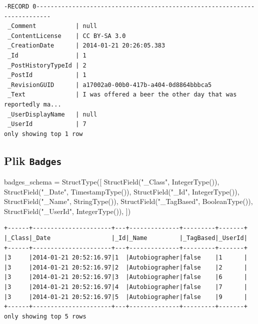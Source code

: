 \documentclass[
  letterpaper,
  DIV=11,
  numbers=noendperiod]{scrreprt}
\newenvironment{Shaded}{\begin{snugshade}}{\end{snugshade}}
\newcommand{\NormalTok}[1]{\textcolor[rgb]{0.00,0.23,0.31}{#1}}
\newcommand{\OperatorTok}[1]{\textcolor[rgb]{0.37,0.37,0.37}{#1}}
\newcommand{\StringTok}[1]{\textcolor[rgb]{0.13,0.47,0.30}{#1}}
\begin{document}
\begin{verbatim}
-RECORD 0--------------------------------------------------------------------------
 _Comment           | null                                                         
 _ContentLicense    | CC BY-SA 3.0                                                 
 _CreationDate      | 2014-01-21 20:26:05.383                                      
 _Id                | 1                                                            
 _PostHistoryTypeId | 2                                                            
 _PostId            | 1                                                            
 _RevisionGUID      | a17002a0-00b0-417b-a404-0d8864bbbca5                         
 _Text              | I was offered a beer the other day that was reportedly ma... 
 _UserDisplayName   | null                                                         
 _UserId            | 7                                                            
only showing top 1 row
\end{verbatim}

\normalsize

\hypertarget{plik-badges}{%
\subsection{\texorpdfstring{Plik
\texttt{Badges}}{Plik Badges}}\label{plik-badges}}

\small

\begin{Shaded}
\begin{Highlighting}[]
\NormalTok{badges\_schema }\OperatorTok{=}\NormalTok{ StructType([}
\NormalTok{    StructField(}\StringTok{"\_Class"}\NormalTok{, IntegerType()),}
\NormalTok{    StructField(}\StringTok{"\_Date"}\NormalTok{, TimestampType()),}
\NormalTok{    StructField(}\StringTok{"\_Id"}\NormalTok{, IntegerType()),}
\NormalTok{    StructField(}\StringTok{"\_Name"}\NormalTok{, StringType()),}
\NormalTok{    StructField(}\StringTok{"\_TagBased"}\NormalTok{, BooleanType()),}
\NormalTok{    StructField(}\StringTok{"\_UserId"}\NormalTok{, IntegerType()),}
\NormalTok{])}
\end{Highlighting}
\end{Shaded}

\begin{verbatim}
+------+----------------------+---+--------------+---------+-------+
|_Class|_Date                 |_Id|_Name         |_TagBased|_UserId|
+------+----------------------+---+--------------+---------+-------+
|3     |2014-01-21 20:52:16.97|1  |Autobiographer|false    |1      |
|3     |2014-01-21 20:52:16.97|2  |Autobiographer|false    |2      |
|3     |2014-01-21 20:52:16.97|3  |Autobiographer|false    |6      |
|3     |2014-01-21 20:52:16.97|4  |Autobiographer|false    |7      |
|3     |2014-01-21 20:52:16.97|5  |Autobiographer|false    |9      |
+------+----------------------+---+--------------+---------+-------+
only showing top 5 rows
\end{verbatim}
\end{document}
